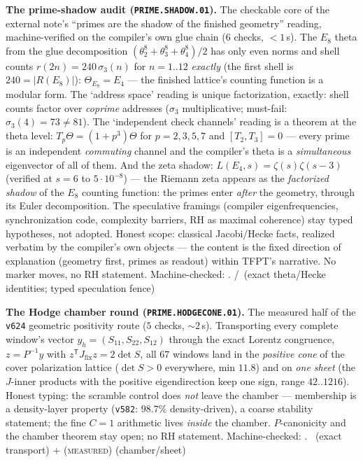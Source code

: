 \par\smallskip\noindent\textbf{The prime-shadow audit
(\texttt{PRIME.SHADOW.01}).}
The checkable core of the external note's ``primes are the shadow of
the finished geometry'' reading, machine-verified on the compiler's
own glue chain ($6$ checks, ${<}1$\,s).  The $E_8$ theta from the
glue decomposition $(\theta_2^8+\theta_3^8+\theta_4^8)/2$ has only
even norms and shell counts $r(2n)=240\,\sigma_3(n)$ for $n=1..12$
\emph{exactly} (the first shell is $240=|R(E_8)|$):
$\Theta_{E_8}=E_4$ --- the finished lattice's counting function is a
modular form.  The `address space' reading is unique factorization,
exactly: shell counts factor over \emph{coprime} addresses
($\sigma_3$ multiplicative; must-fail: $\sigma_3(4)=73\ne81$).  The
`independent check channels' reading is a theorem at the theta
level: $T_p\Theta=(1{+}p^3)\Theta$ for $p=2,3,5,7$ and
$[T_2,T_3]=0$ --- every prime is an independent \emph{commuting}
channel and the compiler's theta is a \emph{simultaneous}
eigenvector of all of them.  And the zeta shadow:
$L(E_4,s)=\zeta(s)\zeta(s{-}3)$ (verified at $s=6$ to
$5\cdot10^{-8}$) --- the Riemann zeta appears as the
\emph{factorized shadow} of the $E_8$ counting function: the primes
enter \emph{after} the geometry, through its Euler decomposition.
The speculative framings (compiler eigenfrequencies, synchronization
code, complexity barriers, RH as maximal coherence) stay typed
hypotheses, not adopted.  Honest scope: classical Jacobi/Hecke
facts, realized verbatim by the compiler's own objects --- the
content is the fixed direction of explanation (geometry first,
primes as readout) within TFPT's narrative.  No marker moves, no RH
statement.
Machine-checked: .
\mE/\mC\ (exact theta/Hecke identities; typed speculation fence)
\par\smallskip


\par\smallskip\noindent\textbf{The Hodge chamber round
(\texttt{PRIME.HODGECONE.01}).}
The measured half of the \texttt{v624} geometric positivity route
($5$ checks, ${\sim}2$\,s).  Transporting every complete window's
vector $y_h=(S_{11},S_{22},S_{12})$ through the exact Lorentz
congruence, $z=P^{-1}y$ with $z^{\mathsf T}J_{\mathrm{fix}}z=2\det S$,
all $67$ windows land in the \emph{positive cone} of the cover
polarization lattice ($\det S>0$ everywhere, min $11.8$) and on
\emph{one sheet} (the $J$-inner products with the positive
eigendirection keep one sign, range $42..1216$).  Honest typing: the
scramble control does \emph{not} leave the chamber --- membership is a
density-layer property (\texttt{v582}: $98.7\%$ density-driven), a
coarse stability statement; the fine $C=1$ arithmetic lives
\emph{inside} the chamber.  $P$-canonicity and the chamber theorem
stay open; no RH statement.
Machine-checked: .
\mE\ (exact transport) $+$ (\textsc{measured}) (chamber/sheet)
\par\smallskip


